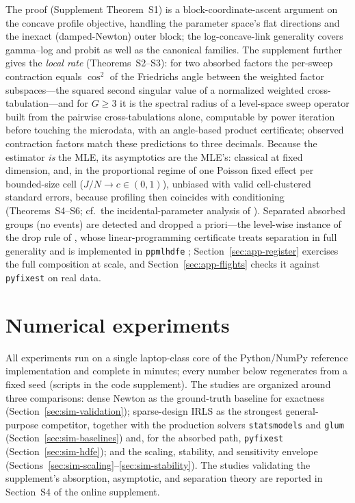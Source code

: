 \documentclass[11pt]{article}
\begin{document}
\noindent The proof (Supplement Theorem~S1) is a block-coordinate-ascent
argument on the concave profile objective, handling the parameter
space's flat directions and the inexact (damped-Newton) outer block; the
log-concave-link generality covers gamma--log and probit as well as the
canonical families.  The supplement further gives the \emph{local rate}
(Theorems~S2--S3): for two absorbed factors the per-sweep contraction
equals $\cos^2$ of the Friedrichs angle between the weighted factor
subspaces---the squared second singular value of a normalized weighted
cross-tabulation---and for $G \ge 3$ it is the spectral radius of a
level-space sweep operator built from the pairwise cross-tabulations
alone, computable by power iteration before touching the microdata, with
an angle-based product certificate; observed contraction factors match
these predictions to three decimals.  Because the estimator \emph{is} the
MLE, its asymptotics are the MLE's: classical at fixed dimension, and,
in the proportional regime of one Poisson fixed effect per bounded-size
cell ($J/N \to c \in (0,1)$), unbiased with valid cell-clustered standard
errors, because profiling then coincides with conditioning
(Theorems~S4--S6; cf.\ the incidental-parameter analysis of
\citealp{fernandezval2016}).  Separated absorbed groups (no events) are detected
and dropped a priori---the level-wise instance of the drop rule of
\citet{correia2019}, whose linear-programming certificate treats
separation in full generality and is implemented in
\texttt{ppmlhdfe} \citep{correia2020};
Section~\ref{sec:app-register} exercises the full composition at scale,
and Section~\ref{sec:app-flights} checks it against \texttt{pyfixest} on
real data.
\section{Numerical experiments}\label{sec:simulations}

All experiments run on a single laptop-class core of the Python/NumPy
reference implementation and complete in minutes; every number below
regenerates from a fixed seed (scripts in the code supplement).  The
studies are organized around three comparisons: dense Newton as the
ground-truth baseline for exactness (Section~\ref{sec:sim-validation});
sparse-design IRLS as the strongest general-purpose competitor,
together with the production solvers \texttt{statsmodels} and
\texttt{glum} (Section~\ref{sec:sim-baselines}) and, for the absorbed
path, \texttt{pyfixest} (Section~\ref{sec:sim-hdfe}); and the
scaling, stability, and sensitivity envelope
(Sections~\ref{sec:sim-scaling}--\ref{sec:sim-stability}).  The studies
validating the supplement's absorption, asymptotic, and separation
theory are reported in Section~S4 of the online supplement.
\end{document}
